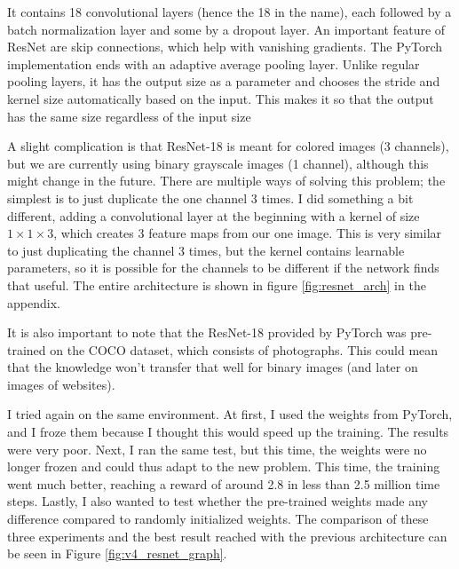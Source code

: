 \documentclass[
  digital,     %
  oneside,     %
  nosansbold,  %
  nocolorbold, %
  lof,         %
  lot,         %
]{fithesis4}
\begin{document}
It contains 18 convolutional layers (hence the 18 in the name), each followed by a batch normalization layer and some by a dropout layer. An important feature of ResNet are skip connections, which help with vanishing gradients. The PyTorch implementation ends with an adaptive average pooling layer. Unlike regular pooling layers, it has the output size as a parameter and chooses the stride and kernel size automatically based on the input. This makes it so that the output has the same size regardless of the input size

A slight complication is that ResNet-18 is meant for colored images (3 channels), but we are currently using binary grayscale images (1 channel), although this might change in the future. There are multiple ways of solving this problem; the simplest is to just duplicate the one channel 3 times. I did something a bit different, adding a convolutional layer at the beginning with a kernel of size $1\times1\times3$, which creates 3 feature maps from our one image. This is very similar to just duplicating the channel 3 times, but the kernel contains learnable parameters, so it is possible for the channels to be different if the network finds that useful. The entire architecture is shown in figure \ref{fig:resnet_arch} in the appendix.

It is also important to note that the ResNet-18 provided by PyTorch was pre-trained on the COCO dataset, which consists of photographs. This could mean that the knowledge won't transfer that well for binary images (and later on images of websites).

I tried again on the same environment. At first, I used the weights from PyTorch, and I froze them because I thought this would speed up the training. The results were very poor. Next, I ran the same test, but this time, the weights were no longer frozen and could thus adapt to the new problem. This time, the training went much better, reaching a reward of around 2.8 in less than 2.5 million time steps. Lastly, I also wanted to test whether the pre-trained weights made any difference compared to randomly initialized weights. The comparison of these three experiments and the best result reached with the previous architecture can be seen in Figure \ref{fig:v4_resnet_graph}. 
\end{document}
